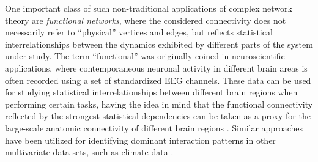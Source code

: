 	One important class of such non-traditional applications of complex network theory are \emph{functional networks}, where the considered connectivity does not necessarily refer to ``physical'' vertices and edges, but reflects statistical interrelationships between the dynamics exhibited by different parts of the system under study. The term ``functional'' was originally coined in neuroscientific applications, where contemporaneous neuronal activity in different brain areas is often recorded using a set of standardized EEG channels. These data can be used for studying statistical interrelationships between different brain regions when performing certain tasks, having the idea in mind that the functional connectivity reflected by the strongest statistical dependencies can be taken as a proxy for the large-scale anatomic connectivity of different brain regions \cite{Bullmore2009,Zhou2006,Zhou2007}. Similar approaches have been utilized for identifying dominant interaction patterns in other multivariate data sets, such as climate data \cite{Tsonis2004,Donges2009b,Donges2009a}.

